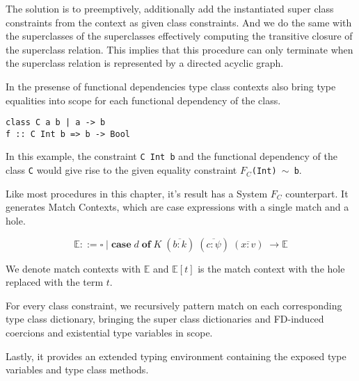 The solution is to preemptively, additionally add the instantiated super class
constraints from the context as given class constraints. And we do the same with
the superclasses of the superclasses effectively computing the transitive
closure of the superclass relation. This implies that this procedure can only
terminate when the superclass relation is represented by a directed acyclic
graph.

In the presense of functional dependencies type class contexts also bring type
equalities into scope for each functional dependency of the class.
\begin{verbatim}
class C a b | a -> b
f :: C Int b => b -> Bool
\end{verbatim}
In this example, the constraint \texttt{C Int b} and the functional dependency
of the class \texttt{C} would give rise to the given equality constraint
\texttt{$F_C$(Int) $\sim$ b}.

Like most procedures in this chapter, it's result has a System $F_C$
counterpart. It generates Match Contexts, which are case expressions with a
single match and a hole.
\begin{figure}[h]
$$
\mathbb{E} ::= \square \mid \textbf{case} \; d \; \textbf{of} \; K \;
(\overline{b : k}) \; (\overline{c : \psi}) \; (\overline{x : v}) \; \rightarrow
\mathbb{E}
$$
\end{figure}
We denote match contexts with $\mathbb{E}$ and $\mathbb{E}[t]$ is the match
context with the hole replaced with the term $t$.

For every class constraint, we recursively pattern match on each corresponding
type class dictionary, bringing the super class dictionaries and FD-induced
coercions and existential type variables in scope.

Lastly, it provides an extended typing environment containing the exposed type
variables and type class methods.

